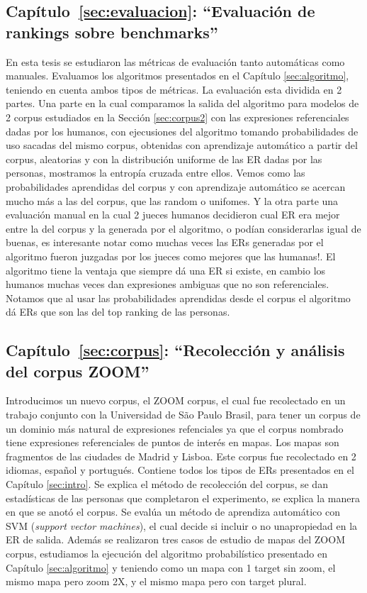 \subsection{Cap\'itulo~\ref{sec:evaluacion}: ``Evaluaci\'on de rankings sobre benchmarks''} 
En esta tesis se estudiaron las m\'etricas de evaluaci\'on tanto autom\'aticas como manuales. Evaluamos los algoritmos presentados 
en el Cap\'itulo \ref{sec:algoritmo}, teniendo en cuenta ambos tipos de m\'etricas. La evaluaci\'on esta dividida en 2 partes. 
Una parte en la cual comparamos la salida del algoritmo para modelos de 2 corpus estudiados en la Secci\'on \ref{sec:corpus2} con
 las expresiones referenciales dadas por los humanos, con ejecusiones del algoritmo tomando probabilidades de uso sacadas del mismo corpus, 
obtenidas con aprendizaje autom\'atico a partir del corpus, aleatorias y con la distribuci\'on uniforme de las ER dadas por las personas, 
mostramos la entrop\'ia cruzada entre ellos. Vemos como las probabilidades aprendidas del corpus y con aprendizaje autom\'atico se acercan 
mucho m\'as a las del corpus, que las random o unifomes. Y la otra parte una evaluaci\'on manual en la cual 2 jueces humanos decidieron cual
 ER era mejor entre la del corpus y la generada por el algoritmo, o pod\'ian considerarlas igual de buenas, es interesante notar como muchas 
veces las ERs generadas por el algoritmo fueron juzgadas por los jueces como mejores que las humanas!. El algoritmo tiene la ventaja que
 siempre d\'a una ER si existe, en cambio los humanos muchas veces dan expresiones ambiguas que no son referenciales. Notamos que al usar 
las probabilidades aprendidas desde el corpus el algoritmo d\'a ERs que son las del top ranking de las personas.

\subsection{Cap\'itulo~\ref{sec:corpus}: ``Recolecci\'on y an\'alisis del corpus ZOOM''} Introducimos un nuevo corpus, 
el ZOOM corpus, el cual fue recolectado en un trabajo conjunto con la Universidad de S\~ao Paulo Brasil, 
para tener un corpus de un dominio m\'as natural de expresiones refenciales ya que el corpus nombrado tiene expresiones referenciales 
de puntos de inter\'es en mapas. Los mapas son fragmentos de las ciudades de Madrid y Lisboa. Este corpus fue recolectado en 2 idiomas, 
espa\~nol y portugu\'es. Contiene todos los tipos de ERs presentados en el Cap\'itulo \ref{sec:intro}. Se explica el m\'etodo de recolecci\'on del corpus, se dan estad\'isticas de las personas que completaron el 
experimento, se explica la manera en que se anot\'o el corpus. Se eval\'ua un m\'etodo de aprendiza autom\'atico con SVM ({\it support vector machines}), el cual decide si incluir o no unapropiedad en la ER de salida. Adem\'as se realizaron tres casos de estudio de mapas del ZOOM corpus, estudiamos la ejecuci\'on del algoritmo probabil\'istico presentado en Cap\'itulo \ref{sec:algoritmo} y teniendo como un mapa con 1 target sin zoom, el mismo mapa pero zoom 2X, y el mismo mapa pero con target plural.

